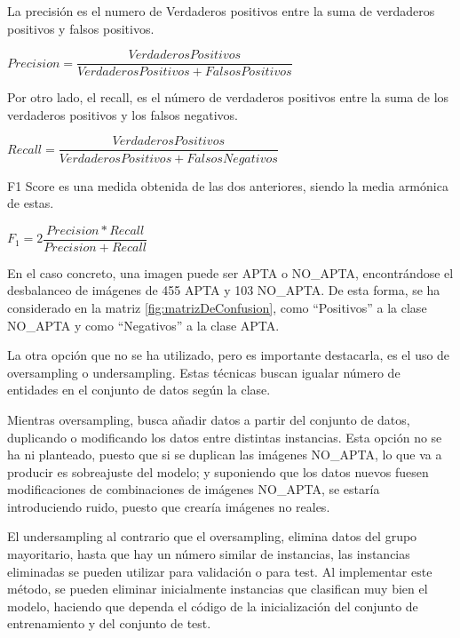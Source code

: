 La precisión es el numero de Verdaderos positivos entre la suma de verdaderos positivos y falsos positivos.
\begin{center}
    $Precision = \dfrac{Verdaderos Positivos} {Verdaderos Positivos + Falsos Positivos} $
\end{center}

Por otro lado, el recall, es el número de verdaderos positivos entre la suma de los verdaderos positivos y los falsos negativos.
\begin{center}
    $Recall = \dfrac{Verdaderos Positivos} {Verdaderos Positivos + Falsos Negativos} $
\end{center}

F1 Score es una medida obtenida de las dos anteriores, siendo la media armónica de estas.
\begin{center}
    $F_1 = 2 \dfrac{Precision * Recall} {Precision + Recall} $
\end{center}

En el caso concreto, una imagen puede ser APTA o NO\_APTA, encontrándose el desbalanceo de imágenes de 455 APTA y 103 NO\_APTA. De esta forma, se ha considerado en la matriz \ref{fig:matrizDeConfusion}, como ``Positivos'' a la clase NO\_APTA y como ``Negativos'' a la clase APTA.

La otra opción que no se ha utilizado, pero es importante destacarla, es el uso de oversampling o undersampling. Estas técnicas buscan igualar número de entidades en el conjunto de datos según la clase. 

Mientras oversampling, busca añadir datos a partir del conjunto de datos, duplicando o modificando los datos entre distintas instancias. Esta opción no se ha ni planteado, puesto que si se duplican las imágenes NO\_APTA, lo que va a producir es sobreajuste del modelo; y suponiendo que los datos nuevos fuesen modificaciones de combinaciones de imágenes  NO\_APTA, se estaría introduciendo ruido, puesto que crearía imágenes no reales.

El undersampling al contrario que el oversampling, elimina datos del grupo mayoritario, hasta que hay un número similar de instancias, las instancias eliminadas se pueden utilizar para validación o para test. Al implementar este método, se pueden eliminar inicialmente instancias que clasifican muy bien el modelo, haciendo que dependa el código de la inicialización del conjunto de entrenamiento y del conjunto de test.